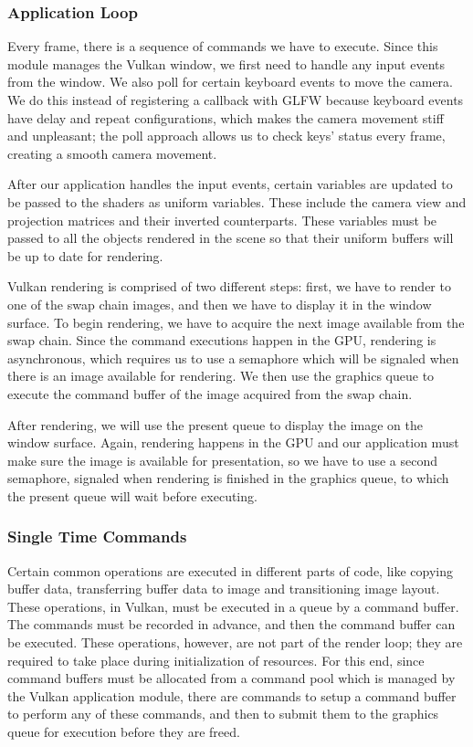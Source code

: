 \subsubsection{Application Loop}
Every frame, there is a sequence of commands we have to execute. Since this module manages the Vulkan window, we first need to handle any input events from the window. We also poll for certain keyboard events to move the camera. We do this instead of registering a callback with GLFW because keyboard events have delay and repeat configurations, which makes the camera movement stiff and unpleasant; the poll approach allows us to check keys' status every frame, creating a smooth camera movement.

After our application handles the input events, certain variables are updated to be passed to the shaders as uniform variables. These include the camera view and projection matrices and their inverted counterparts. These variables must be passed to all the objects rendered in the scene so that their uniform buffers will be up to date for rendering.

Vulkan rendering is comprised of two different steps: first, we have to render to one of the swap chain images, and then we have to display it in the window surface. To begin rendering, we have to acquire the next image available from the swap chain. Since the command executions happen in the GPU, rendering is asynchronous, which requires us to use a semaphore which will be signaled when there is an image available for rendering. We then use the graphics queue to execute the command buffer of the image acquired from the swap chain.

After rendering, we will use the present queue to display the image on the window surface. Again, rendering happens in the GPU and our application must make sure the image is available for presentation, so we have to use a second semaphore, signaled when rendering is finished in the graphics queue, to which the present queue will wait before executing.

\subsubsection{Single Time Commands}
Certain common operations are executed in different parts of code, like copying buffer data, transferring buffer data to image and transitioning image layout. These operations, in Vulkan, must be executed in a queue by a command buffer. The commands must be recorded in advance, and then the command buffer can be executed. These operations, however, are not part of the render loop; they are required to take place during initialization of resources. For this end, since command buffers must be allocated from a command pool which is managed by the Vulkan application module, there are commands to setup a command buffer to perform any of these commands, and then to submit them to the graphics queue for execution before they are freed.

